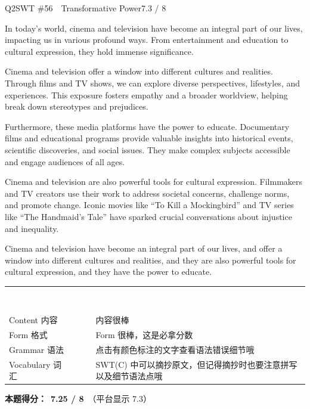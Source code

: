 \begin{qblock}{Q2\quad SWT \#56\ \ Transformative Power}{7.3 / 8}

\begin{promptbox}
In today's world, cinema and television have become an integral part of our lives, impacting us in various profound ways. From entertainment and education to cultural expression, they hold immense significance.

Cinema and television offer a window into different cultures and realities. Through films and TV shows, we can explore diverse perspectives, lifestyles, and experiences. This exposure fosters empathy and a broader worldview, helping break down stereotypes and prejudices.

Furthermore, these media platforms have the power to educate. Documentary films and educational programs provide valuable insights into historical events, scientific discoveries, and social issues. They make complex subjects accessible and engage audiences of all ages.

Cinema and television are also powerful tools for cultural expression. Filmmakers and TV creators use their work to address societal concerns, challenge norms, and promote change. Iconic movies like ``To Kill a Mockingbird'' and TV series like ``The Handmaid's Tale'' have sparked crucial conversations about injustice and inequality.
\end{promptbox}

\begin{youbox}
Cinema and television have become an integral part of our lives, and  offer a window into different cultures and realities, and they are also powerful tools for cultural expression, and they have the power to educate.
\end{youbox}

{\small\scorehead
\begin{tabularx}{\linewidth}{l c Y}
\textcolor{white}{\bfseries 维度} & \textcolor{white}{\bfseries 得分} & \textcolor{white}{\bfseries AI 建议}\\
Content 内容        &     & 内容很棒\\
Form 格式          &     & Form 很棒，这是必拿分数\\
Grammar 语法       &   & 点击有颜色标注的文字查看语法错误细节哦~\\
Vocabulary 词汇    &  & SWT(C) 中可以摘抄原文，但记得摘抄时也要注意拼写以及细节语法点哦\\
\end{tabularx}}
\smallskip
\textbf{本题得分：}\ {\color{cAccent}\bfseries 7.25 / 8}\ {\footnotesize\color{gray}（平台显示 7.3）}

\end{qblock}

